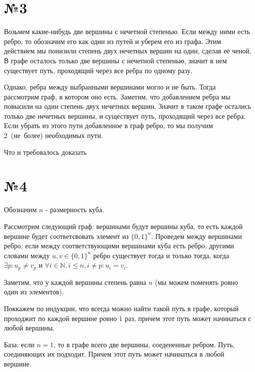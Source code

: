 \documentclass[12pt]{article}
\begin{document}
	
	\section*{№3}
	
	Возьмем какие-нибудь две вершины с нечетной степенью. 
	Если между ними есть ребро, то обозначим его как один из путей и уберем его из графа.
	Этим действием мы понизили степень двух нечетных вершин на один, сделав ее ченой.
	В графе осталось только две вершины с нечетной степенью, значит в нем существует путь, проходящий
	через все ребра по одному разу.
	
	Однако, ребра между выбранными вершинами могло и не быть. Тогда рассмотрим граф, в котором оно есть.
	Заметим, что добавлением ребра мы повысили на один степень двух нечетных вершин.
	Значит в таком графе остались только две нечетных вершины, и существует путь, проходящий
	через все ребра. Если убрать из этого пути добавленное в граф ребро, то мы получим 2~(не~более) 
	необходимых пути. 
	
	Что и требовалось доказать

	\section*{№4}
	Обозначим $n$ - размерность куба.
	
	Рассмотрим следующий граф: вершинами будут вершины куба, 
	то есть каждой вершине будет соответсвовать элемент из $\{0, 1\}^n$.
	Проведем между вершинами ребро, если между соответствующими вершинами 
	куба есть ребро, другими словами между $u, v \in \{0, 1\}^n$ ребро
	существует тогда и только тогда, когда 
	$ \exists	p: u_p \neq v_p$ и $\forall i \in \mathbb{N}, i \leqslant n,
	i \neq p : u_i=v_i$.
	
	Заметим, что у каждой вершины степень равна $n$ 
	(мы можем поменять ровно один из элементов).
	
	Поккажем по индукции, что всегда можно найти такой путь в графе, 
	который проходжит по каждой вершине ровно 1 раз, 
	причем этот путь может начинаться с любой вершины.
	
	База: если $n = 1$, то в графе всего две вершины, соедененные ребром.
	Путь, соединяющих их подходит. 
	Причем этот путь может начинаться в любой вершине.
	
\end{document}
